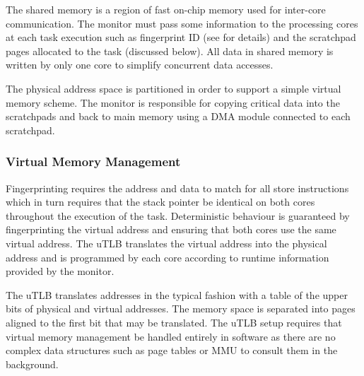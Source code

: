 	The shared memory is a region of fast on-chip memory used for inter-core communication. 
	The monitor must pass some information to the processing cores at each task execution such as fingerprint ID (see \cite{ugthesis} for details) and the scratchpad pages allocated to the task (discussed below).
	All data in shared memory is written by only one core to simplify concurrent data accesses. 

	The physical address space is partitioned in order to support a simple virtual memory scheme. 
	The monitor is responsible for copying critical data into the scratchpads and back to main memory using a DMA module connected to each scratchpad.



\subsubsection{Virtual Memory Management}
\label{s:virt-mem}
	Fingerprinting requires the address and data to match for all store instructions which in turn requires that the stack pointer be identical on both cores throughout the execution of the task. 
	Deterministic behaviour is guaranteed by fingerprinting the virtual address and ensuring that both cores use the same virtual address. 
	The uTLB translates the virtual address into the physical address and is programmed by each core according to runtime information provided by the monitor. 		
	
	The uTLB translates addresses in the typical fashion with a table of the upper bits of physical and virtual addresses.
	The memory space is separated into pages aligned to the first bit that may be translated.
	The uTLB setup requires that virtual memory management be handled entirely in software as there are no complex data structures such as page tables or MMU to consult them in the background. 
	
